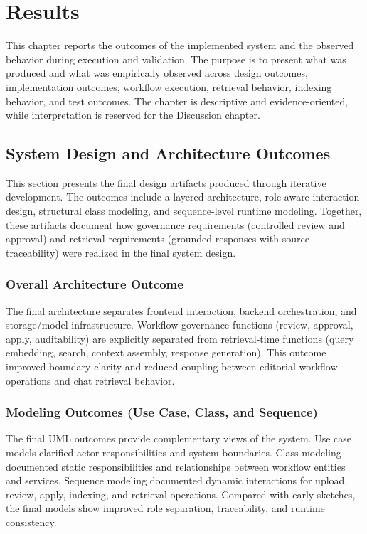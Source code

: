 \chapter{Results}

This chapter reports the outcomes of the implemented system and the observed behavior during execution and validation.
The purpose is to present what was produced and what was empirically observed across design outcomes, implementation outcomes, workflow execution, retrieval behavior, indexing behavior, and test outcomes.
The chapter is descriptive and evidence-oriented, while interpretation is reserved for the Discussion chapter.

\section{System Design and Architecture Outcomes}

This section presents the final design artifacts produced through iterative development.
The outcomes include a layered architecture, role-aware interaction design, structural class modeling, and sequence-level runtime modeling.
Together, these artifacts document how governance requirements (controlled review and approval) and retrieval requirements (grounded responses with source traceability) were realized in the final system design.

\subsection{Overall Architecture Outcome}

The final architecture separates frontend interaction, backend orchestration, and storage/model infrastructure.
Workflow governance functions (review, approval, apply, auditability) are explicitly separated from retrieval-time functions (query embedding, search, context assembly, response generation).
This outcome improved boundary clarity and reduced coupling between editorial workflow operations and chat retrieval behavior.

\subsection{Modeling Outcomes (Use Case, Class, and Sequence)}

The final UML outcomes provide complementary views of the system.
Use case models clarified actor responsibilities and system boundaries.
Class modeling documented static responsibilities and relationships between workflow entities and services.
Sequence modeling documented dynamic interactions for upload, review, apply, indexing, and retrieval operations.
Compared with early sketches, the final models show improved role separation, traceability, and runtime consistency.

